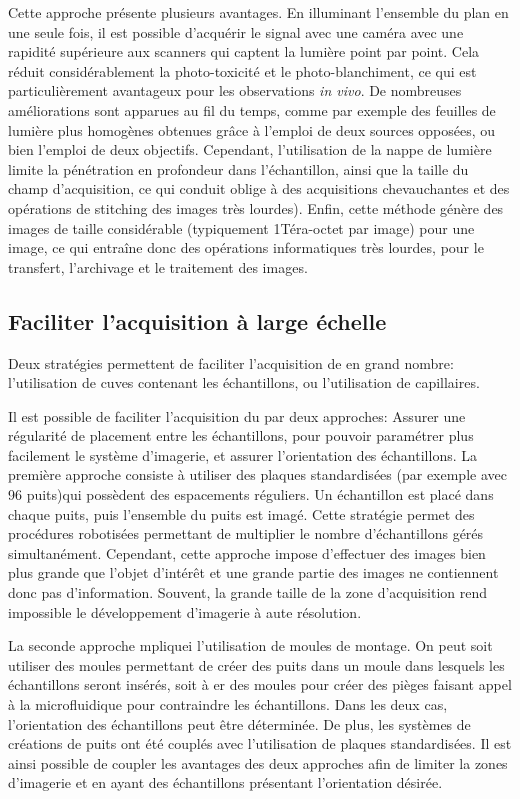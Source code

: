 \documentclass[\main/main.tex]{subfiles}
\begin{document}
Cette approche présente plusieurs avantages. En illuminant l'ensemble du plan en une seule fois, il est possible d'acquérir le signal avec une caméra avec une rapidité supérieure aux scanners qui captent la lumière point par point.
Cela réduit considérablement la photo-toxicité et le photo\hyp{}blanchiment, ce qui est particulièrement avantageux pour les observations  \textit{in vivo}.
%
De nombreuses améliorations sont apparues au fil du temps, comme par exemple des feuilles de lumière plus homogènes obtenues grâce à l'emploi de deux sources opposées\cite{huisken_2007}, ou bien l'emploi de deux objectifs.
%
Cependant, l'utilisation de la nappe de lumière limite la pénétration en profondeur dans l'échantillon, ainsi que la taille du champ d'acquisition, ce qui conduit oblige à des acquisitions chevauchantes et des opérations de stitching des images très lourdes). Enfin, cette méthode génère des images de taille considérable (typiquement 1Téra-octet par image) pour une image, ce qui entraîne donc des opérations informatiques très lourdes, pour le transfert, l'archivage et le traitement des images.

    \subsection{Faciliter l'acquisition à large échelle\label{sec:easy_acq}}
    
Deux stratégies  permettent de faciliter l'acquisition de \pz{} en grand nombre: l'utilisation de cuves contenant les échantillons, ou l'utilisation de capillaires.
   
%
Il est possible de faciliter l'acquisition du \pz{} par deux approches:
Assurer une régularité de placement entre les échantillons,
pour pouvoir paramétrer plus facilement le système d'imagerie, et assurer l'orientation des échantillons.
%
La première approche consiste à utiliser des plaques standardisées (par exemple avec 96 puits)qui possèdent des espacements réguliers. Un échantillon est placé dans chaque puits, puis l'ensemble du puits est imagé. Cette stratégie permet des procédures robotisées permettant de multiplier le nombre d'échantillons gérés simultanément.
%
Cependant, cette approche impose d'effectuer des images bien plus grande que l'objet d'intérêt et une grande partie des images ne contiennent donc pas d'information. Souvent, la grande taille de la zone d'acquisition rend impossible le développement d'imagerie à aute résolution.

%
\label{sec:moule_montage}
La seconde approche mpliquei l'utilisation de moules de montage.
%
On peut soit utiliser des moules permettant de créer des puits dans un moule dans lesquels les échantillons seront insérés\cite{donoughe_2018,kleinhans_2019}, soit à er des moules pour créer des pièges faisant appel à la microfluidique pour contraindre les échantillons\cite{khalili_2019}. Dans les deux cas, l'orientation des échantillons peut être déterminée.
%
De plus, les systèmes de créations de puits ont été couplés avec l'utilisation de plaques standardisées\cite{wittbrodt_2014}.
%
Il est ainsi possible de coupler les avantages des deux approches afin de limiter la zones d'imagerie et en ayant des échantillons présentant l'orientation désirée.
\end{document}
